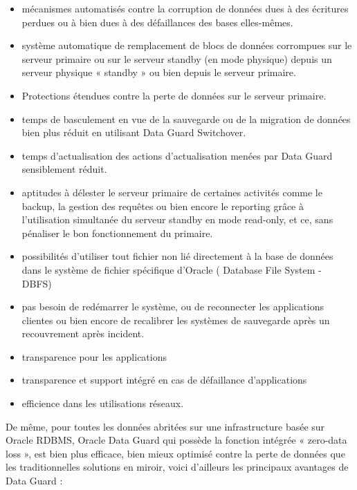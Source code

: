 \documentclass[12pt]{report}
\begin{document}
\begin{itemize}
\item mécanismes automatisés contre la corruption de données dues à des écritures
  perdues ou à bien dues à des défaillances des bases elles-mêmes.
\item système automatique de remplacement de blocs de données corrompues sur le
  serveur primaire ou sur le serveur standby (en mode physique) depuis un serveur
  physique « standby » ou bien depuis le serveur primaire.
\item Protections étendues contre la perte de données sur le serveur primaire.
\item temps de basculement en vue de la sauvegarde ou de la migration de données
  bien plus réduit en utilisant Data Guard Switchover.
\item temps d'actualisation des actions d'actualisation menées par Data Guard
  sensiblement réduit.
\item aptitudes à délester le serveur primaire de certaines activités comme le
  backup, la gestion des requêtes ou bien encore le reporting grâce à
  l'utilisation simultanée du serveur standby en mode read-only, et ce, sans
  pénaliser le bon fonctionnement du primaire.
\item possibilités d'utiliser tout fichier non lié directement à la base de
  données dans le système de fichier spécifique d'Oracle ( Database File System
  - DBFS)
\item pas besoin de redémarrer le système, ou de reconnecter les applications
  clientes ou bien encore de recalibrer les systèmes de sauvegarde après un
  recouvrement après incident.
\item transparence pour les applications
\item transparence et support intégré en cas de défaillance d'applications
\item efficience dans les utilisations réseaux.
\end{itemize}

\vspace{1cm}

De même, pour toutes les données abritées sur une infrastructure basée sur
Oracle RDBMS, Oracle Data Guard qui possède la fonction intégrée « zero-data
  loss », est bien plus efficace, bien mieux optimisé contre la perte de données
que les traditionnelles solutions en miroir, voici d'ailleurs les principaux
avantages de Data Guard : \\
\end{document}

